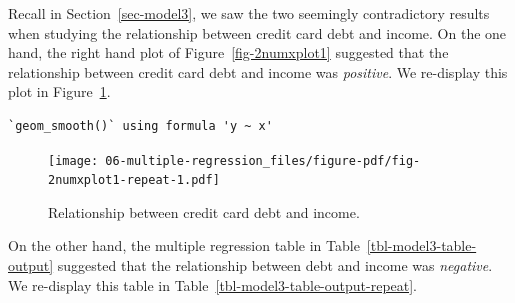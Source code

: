 \documentclass[
  letterpaper,
  DIV=11,
  numbers=noendperiod]{scrreprt}
\theoremstyle{definition}
\theoremstyle{remark}
\begin{document}
Recall in Section~\ref{sec-model3}, we saw the two seemingly
contradictory results when studying the relationship between credit card
debt and income. On the one hand, the right hand plot of
Figure~\ref{fig-2numxplot1} suggested that the relationship between
credit card debt and income was \emph{positive}. We re-display this plot
in Figure~\ref{fig-2numxplot1-repeat}.

\begin{verbatim}
`geom_smooth()` using formula 'y ~ x'
\end{verbatim}

\begin{figure}

{\centering \texttt{[image: 06-multiple-regression\_files/figure-pdf/fig-2numxplot1-repeat-1.pdf]}

}

\caption{\label{fig-2numxplot1-repeat}Relationship between credit card
debt and income.}

\end{figure}

On the other hand, the multiple regression table in
Table~\ref{tbl-model3-table-output} suggested that the relationship
between debt and income was \emph{negative}. We re-display this table in
Table~\ref{tbl-model3-table-output-repeat}.
\end{document}
